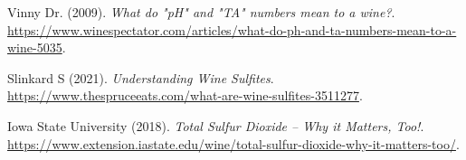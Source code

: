 \documentclass[letterpaper,8pt,twocolumn,twoside,]{pinp}
\begin{document}
\begin{thebibliography}{3}
\bibitem[{Vinny Dr. (2009)}]{}
Vinny Dr. (2009).
\newblock \emph{What do "pH" and "TA" numbers mean to a wine?}.
\newblock \urlprefix\url{https://www.winespectator.com/articles/what-do-ph-and-ta-numbers-mean-to-a-wine-5035}.

\bibitem[{Slinkard S (2021)}]{}
Slinkard S (2021).
\newblock \emph{Understanding Wine Sulfites}.
\newblock \urlprefix\url{https://www.thespruceeats.com/what-are-wine-sulfites-3511277}.

Iowa State University (2018).
\newblock \emph{Total Sulfur Dioxide – Why it Matters, Too!}.
\newblock \urlprefix\url{https://www.extension.iastate.edu/wine/total-sulfur-dioxide-why-it-matters-too/}.

\end{thebibliography}
\end{document}
